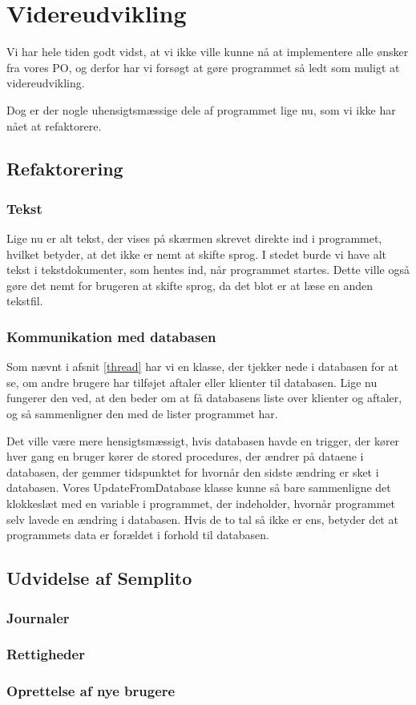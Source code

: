 \section{Videreudvikling}
\label{kapitel:Videreudvikling}

Vi har hele tiden godt vidst, at vi ikke ville kunne nå at implementere alle ønsker fra vores PO, og derfor har vi forsøgt at gøre programmet så ledt som muligt at videreudvikling.

Dog er der nogle uhensigtsmæssige dele af programmet lige nu, som vi ikke har nået at refaktorere.

\subsection{Refaktorering}
\subsubsection{Tekst}
Lige nu er alt tekst, der vises på skærmen skrevet direkte ind i programmet, hvilket betyder, at det ikke er nemt at skifte sprog.
I stedet burde vi have alt tekst i tekstdokumenter, som hentes ind, når programmet startes.
Dette ville også gøre det nemt for brugeren at skifte sprog, da det blot er at læse en anden tekstfil.

\subsubsection{Kommunikation med databasen}
Som nævnt i afsnit \ref{thread} har vi en klasse, der tjekker nede i databasen for at se, om andre brugere har tilføjet aftaler eller klienter til databasen.
Lige nu fungerer den ved, at den beder om at få databasens liste over klienter og aftaler, og så sammenligner den med de lister programmet har.

Det ville være mere hensigtsmæssigt, hvis databasen havde en trigger, der kører hver gang en bruger kører de stored procedures, der ændrer på dataene i databasen, der gemmer tidspunktet for hvornår den sidste ændring er sket i databasen.
Vores UpdateFromDatabase klasse kunne så bare sammenligne det klokkeslæt med en variable i programmet, der indeholder, hvornår programmet selv lavede en ændring i databasen.
Hvis de to tal så ikke er ens, betyder det at programmets data er forældet i forhold til databasen.

\subsection{Udvidelse af Semplito}

\subsubsection{Journaler}

\subsubsection{Rettigheder}

\subsubsection{Oprettelse af nye brugere}